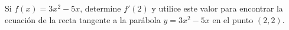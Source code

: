 \item Si $f(x) = 3x^2 - 5x$, determine $f'(2)$ y utilice este valor para encontrar la ecuación de la recta tangente a la parábola $y = 3x^2 - 5x$ en el punto $(2,2)$.
